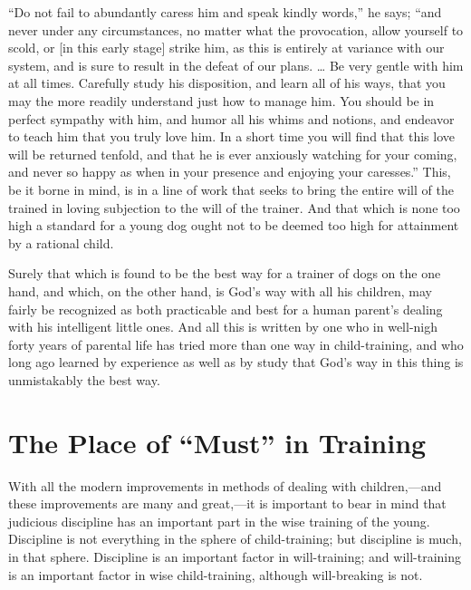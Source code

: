 \documentclass[
]{book}
\begin{document}
``Do not fail to abundantly caress him and speak kindly words,'' he says; ``and never under any circumstances, no matter what the provocation, allow yourself to scold, or {[}in this early stage{]} strike him, as this is entirely at variance with our system, and is sure to result in the defeat of our plans. \ldots{} Be very gentle with him at all times. Carefully study his disposition, and learn all of his ways, that you may the more readily understand just how to manage him. You should be in perfect sympathy with him, and humor all his whims and notions, and endeavor to teach him that you truly love him. In a short time you will find that this love will be returned tenfold, and that he is ever anxiously watching for your coming, and never so happy as when in your presence and enjoying your caresses.'' This, be it borne in mind, is in a line of work that seeks to bring the entire will of the trained in loving subjection to the will of the trainer. And that which is none too high a standard for a young dog ought not to be deemed too high for attainment by a rational child.

Surely that which is found to be the best way for a trainer of dogs on the one hand, and which, on the other hand, is God's way with all his children, may fairly be recognized as both practicable and best for a human parent's dealing with his intelligent little ones. And all this is written by one who in well-nigh forty years of parental life has tried more than one way in child-training, and who long ago learned by experience as well as by study that God's way in this thing is unmistakably the best way.

\hypertarget{the-place-of-must-in-training}{%
\chapter{The Place of ``Must'' in Training}\label{the-place-of-must-in-training}}

With all the modern improvements in methods of dealing with children,---and these improvements are many and great,---it is important to bear in mind that judicious discipline has an important part in the wise training of the young. Discipline is not everything in the sphere of child-training; but discipline is much, in that sphere. Discipline is an important factor in will-training; and will-training is an important factor in wise child-training, although will-breaking is not.
\end{document}
